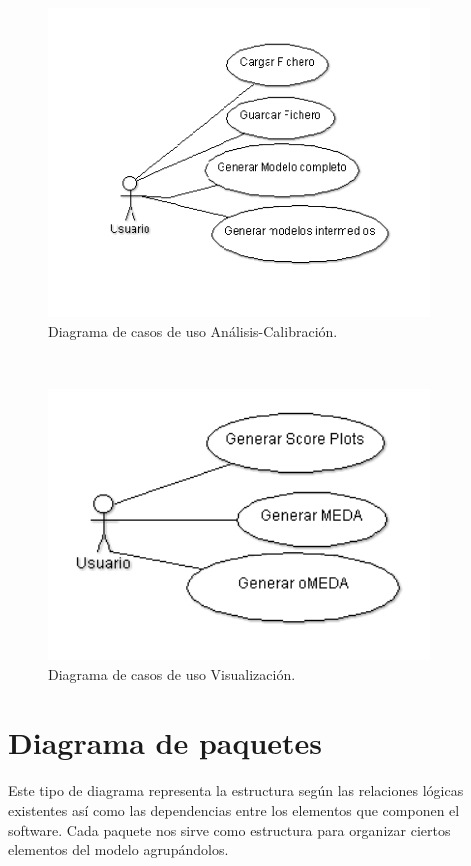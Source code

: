 \begin{figure}[H]
\centering
\includegraphics[width=0.9\textwidth]{imagenes/diagramas/DCU1.png}
\caption{Diagrama de casos de uso Análisis-Calibración.}
\end{figure}
\
\begin{figure}[H]
\centering
\includegraphics[width=0.9\textwidth]{imagenes/diagramas/DCU2.png}
\caption{Diagrama de casos de uso Visualización.}
\end{figure}
\newpage
\section{Diagrama de paquetes}

Este tipo de diagrama representa la estructura según las relaciones lógicas existentes así como las dependencias entre los elementos que componen el software. Cada paquete nos sirve como estructura para organizar ciertos elementos del modelo agrupándolos.
\bigskip

